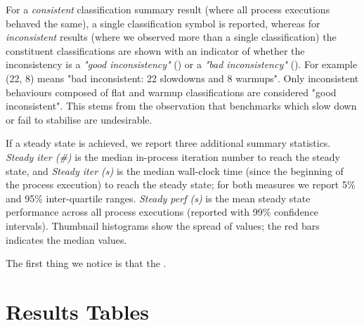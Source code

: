 \documentclass[a4paper]{article}
\newcommand{\graalce}{\textsc{Graal CE}\xspace}
\newcommand{\graalcehs}{\textsc{Graal CE Hotspot}\xspace}
\newcommand{\bencherseven}{Linux$_\mathrm{1240v5}$\xspace}
\newcommand{\bencherten}{Linux$_\mathrm{1240v6}$\xspace}
\begin{document}
For a \emph{consistent} classification summary result (where all process
executions behaved the same), a single classification symbol is reported,
whereas for \emph{inconsistent} results (where we observed more than a single
classification) the constituent classifications are shown with an indicator of
whether the inconsistency is a \emph{"good inconsistency"} (\goodinconsistent)
or a \emph{"bad inconsistency"} (\badinconsistent). For example
\badinconsistent(22\slowdown, 8\warmup) means "bad inconsistent: 22 slowdowns
and 8 warmups". Only inconsistent behaviours composed of flat and warmup
classifications are considered "good inconsistent". This stems from the
observation that benchmarks which slow down or fail to stabilise are
undesirable.

If a steady state is achieved, we report three additional summary statistics.
\emph{Steady iter (\#)} is the median in-process iteration number to reach the
steady state, and \emph{Steady iter (s)} is the median wall-clock time (since
the beginning of the process execution) to reach the steady state; for both
measures we report 5\% and 95\% inter-quartile ranges. \emph{Steady perf (s)}
is the mean steady state performance across all process executions (reported
with 99\% confidence intervals). Thumbnail histograms show the spread of
values; the red bars indicates the median values.

The first thing we notice is that the .




\appendix

\section{Results Tables}


\newcommand{\captionbsevengraalce}{Results for \graalce on \bencherseven.}


\newpage
\newcommand{\captionbsevengraalcehs}{Results for \graalcehs on \bencherseven.}


\newpage
\newcommand{\captionbtengraalce}{Results for \graalce on \bencherten.}


\newpage
\newcommand{\captionbtengraalcehs}{Results for \graalcehs on \bencherten.}

\end{document}
